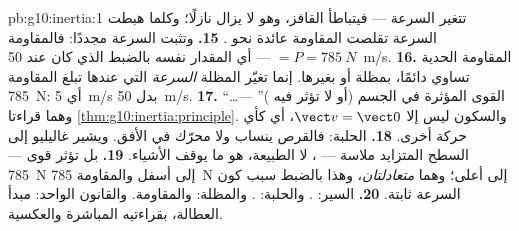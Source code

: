 \begin{solution}{pb:g10:inertia:1}
تتغير السرعة --- فيتباطأ القافز، وهو لا يزال نازلًا؛ وكلما
هبطت السرعة تقلصت المقاومة عائدة نحو .
\textbf{15.} وتثبت السرعة مجددًا: فالمقاومة $= P = \qty{785}{N}$ --- أي
المقدار نفسه بالضبط الذي كان عند \qty{50}{m/s}.
\textbf{16.} المقاومة الحدية تساوي  دائمًا، بمظلة
أو بغيرها. إنما تغيّر المظلة \emph{السرعة} التي عندها تبلغ المقاومة
\qty{785}{N}: أي \qty{5}{m/s} بدل \qty{50}{m/s}.
\textbf{17.} ``\dots القوى المؤثرة في الجسم  (أو لا تؤثر فيه
)'' --- وهما قراءتا \cref{thm:g10:inertia:principle}. والسكون
ليس إلا $\vect v = \vect 0$، أي  كأي حركة أخرى.
\textbf{18.} الحلبة: فالقرص ينساب ولا محرّك في الأفق. ويشير غاليليو
إلى السطح المتزايد ملاسة --- ، لا الطبيعة، هو ما
يوقف الأشياء.
\textbf{19.} بل تؤثر قوى ---  \qty{785}{N} إلى أسفل والمقاومة
\qty{785}{N} إلى أعلى؛ وهما \emph{متعادلتان}، وهذا بالضبط سبب كون
السرعة ثابتة.
\textbf{20.} السير:  . والحلبة:  . والمظلة:  والمقاومة. والقانون الواحد: مبدأ
العطالة، بقراءتيه المباشرة والعكسية.
\end{solution}
